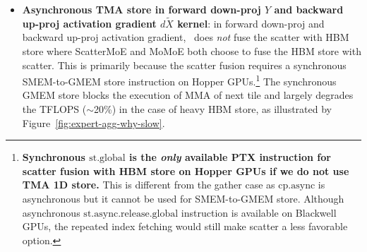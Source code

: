 \begin{itemize}[noitemsep]
    \item \textbf{Asynchronous TMA store in forward down-proj $Y$ and backward up-proj activation gradient $d\tilde{X}$ kernel}: in forward down-proj and backward up-proj activation gradient, \Algname~does \emph{not} fuse the scatter with HBM store where ScatterMoE and MoMoE both choose to fuse the HBM store with scatter. This is primarily because the scatter fusion requires a synchronous SMEM-to-GMEM store instruction on Hopper GPUs.\footnote{\textbf{Synchronous $\mathrm{st.global}$ is the \emph{only} available PTX instruction for scatter fusion with HBM store on Hopper GPUs if we do not use TMA 1D store.} This is different from the gather case as $\mathrm{cp.async}$ is asynchronous but it cannot be used for SMEM-to-GMEM store. Although asynchronous $\mathrm{st.async.release.global}$ instruction is available on Blackwell GPUs, the repeated index fetching would still make scatter a less favorable option.} The synchronous GMEM store blocks the execution of MMA of next tile and largely degrades the TFLOPS ($\sim$20\%) in the case of heavy HBM store, as illustrated by Figure~\ref{fig:expert-agg-why-slow}. 
\end{itemize}





